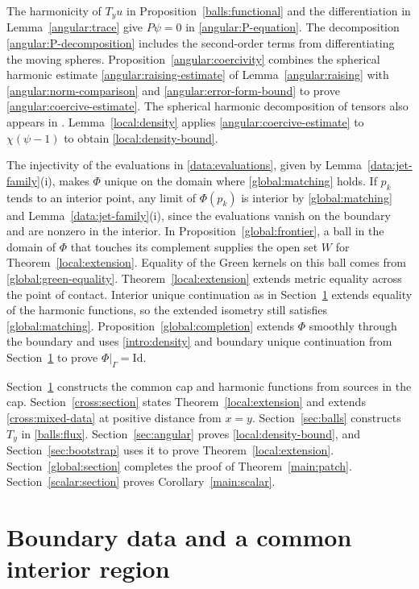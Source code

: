 \documentclass[11pt,a4paper]{article}
\theoremstyle{definition}
\theoremstyle{remark}
\newcommand{\Id}{\mathrm{Id}}
\numberwithin{equation}{section}
\begin{document}
The harmonicity of $T_yu$ in Proposition~\ref{balls:functional}
and the differentiation in Lemma~\ref{angular:trace} give $P\psi=0$
in \eqref{angular:P-equation}.
The decomposition \eqref{angular:P-decomposition} includes the
second-order terms from differentiating the moving spheres.
Proposition~\ref{angular:coercivity} combines the spherical harmonic
estimate \eqref{angular:raising-estimate} of Lemma~\ref{angular:raising}
with \eqref{angular:norm-comparison} and \eqref{angular:error-form-bound}
to prove \eqref{angular:coercive-estimate}. The spherical harmonic
decomposition of tensors also appears in \cite{PSU15,GPSU16}.
Lemma~\ref{local:density} applies \eqref{angular:coercive-estimate}
to $\chi(\psi-1)$ to obtain \eqref{local:density-bound}.

The injectivity of the evaluations in \eqref{data:evaluations},
given by Lemma~\ref{data:jet-family}(i), makes $\Phi$ unique on the
domain where \eqref{global:matching} holds. If $p_k$ tends to an
interior point, any limit of $\Phi(p_k)$ is interior by
\eqref{global:matching} and Lemma~\ref{data:jet-family}(i), since
the evaluations vanish on the boundary and are nonzero in the interior. In Proposition~\ref{global:frontier},
a ball in the domain of $\Phi$ that touches its complement supplies
the open set $W$ for Theorem~\ref{local:extension}. Equality of the
Green kernels on this ball comes from \eqref{global:green-equality}.
Theorem~\ref{local:extension} extends metric equality across the
point of contact. Interior unique continuation as in
Section~\ref{data:section} extends equality of the harmonic functions,
so the extended isometry still satisfies \eqref{global:matching}.
Proposition~\ref{global:completion} extends $\Phi$ smoothly through
the boundary and uses \eqref{intro:density} and boundary unique
continuation from Section~\ref{data:section} to prove $\Phi|_\Gamma=\Id$.

Section~\ref{data:section} constructs the common cap and harmonic
functions from sources in the cap. Section~\ref{cross:section}
states Theorem~\ref{local:extension} and extends
\eqref{cross:mixed-data} at positive distance from $x=y$.
Section~\ref{sec:balls} constructs $T_y$ in \eqref{balls:flux}.
Section~\ref{sec:angular} proves \eqref{local:density-bound}, and
Section~\ref{sec:bootstrap} uses it to prove
Theorem~\ref{local:extension}. Section~\ref{global:section} completes
the proof of Theorem~\ref{main:patch}. Section~\ref{scalar:section}
proves Corollary~\ref{main:scalar}.
\section{Boundary data and a common interior region}
\label{data:section}
\end{document}
